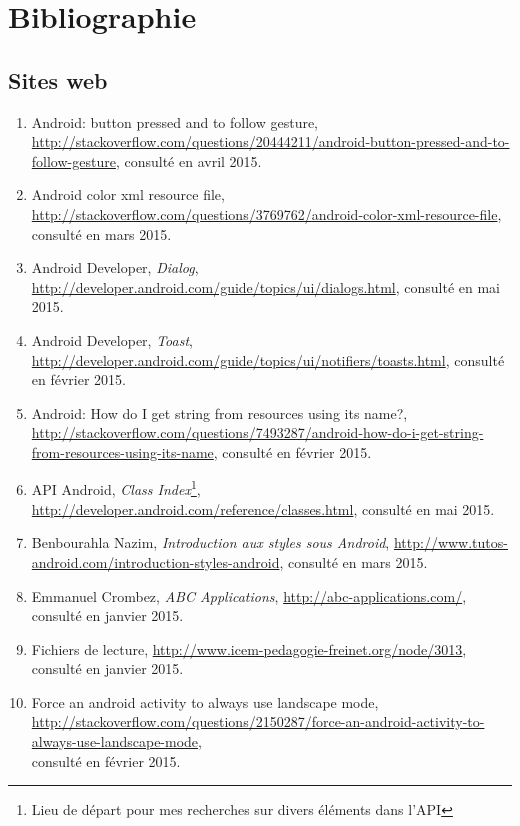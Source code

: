 \section{Bibliographie}

\subsection*{Sites web}
\begin{enumerate}
\item Android: button pressed and to follow gesture, \url{http://stackoverflow.com/questions/20444211/android-button-pressed-and-to-follow-gesture}, consulté en avril 2015.

\item Android color xml resource file, \url{http://stackoverflow.com/questions/3769762/android-color-xml-resource-file}, consulté en mars 2015.

\item Android Developer, \textit{Dialog}, \url{http://developer.android.com/guide/topics/ui/dialogs.html}, consulté en mai 2015.

\item Android Developer, \textit{Toast}, \url{http://developer.android.com/guide/topics/ui/notifiers/toasts.html}, consulté en février 2015.

\item Android: How do I get string from resources using its name?, \url{http://stackoverflow.com/questions/7493287/android-how-do-i-get-string-from-resources-using-its-name}, consulté en février 2015.

\item API Android, \textit{Class Index}\footnote{Lieu de départ pour mes recherches sur divers éléments dans l'API}, \url{http://developer.android.com/reference/classes.html}, consulté en mai 2015.

\item  Benbourahla Nazim, \textit{Introduction aux styles sous Android}, \url{http://www.tutos-android.com/introduction-styles-android}, consulté en mars 2015.

\item Emmanuel Crombez, \textit{ABC Applications}, \url{http://abc-applications.com/}, consulté en janvier 2015.

\item Fichiers de lecture, \url{http://www.icem-pedagogie-freinet.org/node/3013}, consulté en janvier 2015.

\item Force an android activity to always use landscape mode, \url{http://stackoverflow.com/questions/2150287/force-an-android-activity-to-always-use-landscape-mode},\\ consulté en février 2015.


\end{enumerate}
